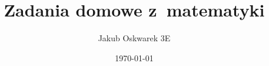 \documentclass[a4paper, fleqn, oneside, dvipsnames, leqno]{report}
\title{Zadania domowe z~matematyki}
\author{Jakub Oskwarek 3E}
\date{\today}
\begin{document}
    
    
    
    
    
    
    
    
    
    
    
    
    
    
    
    
    
    
    
    
    
    \label{lastpage}
\end{document}
